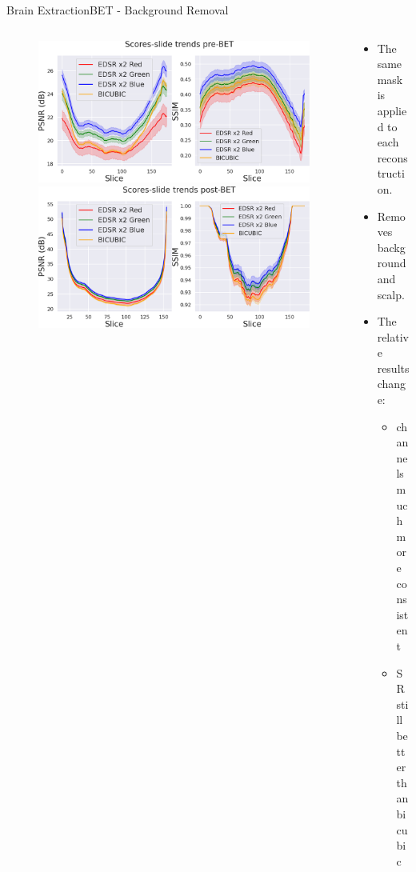 \documentclass[10pt, unicode]{beamer}
\begin{document}
\begin{frame}{Brain Extraction}{BET - Background Removal} 

  \begin{columns}
    
    \begin{column}{0.5\textwidth}
      \begin{figure}
        \vspace{-1cm}
        \includegraphics[scale=0.14]{./images/EDSR_score_t1_prebet.png} 
        \includegraphics[scale=0.14]{./images/EDSR_score_slide_t1_betted.png}
      \end{figure}
    \end{column}
    
    \begin{column}{0.5\textwidth}
      \begin{itemize}
        \item The same mask is applied to each reconstruction.
        \item Removes background and scalp.
        \item The relative results change:
          \begin{itemize}
            \item channels much more consistent
            \item SR still better than bicubic
          \end{itemize}
      \end{itemize}
    \end{column}
  \end{columns}  
  
\end{frame}
\end{document}
